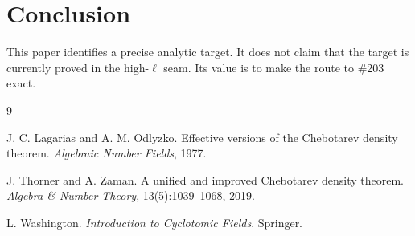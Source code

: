 \documentclass[11pt]{article}
\newcommand{\1}{\mathbf 1}
\begin{document}
\section{Conclusion}

This paper identifies a precise analytic target.  It does not claim that the target is currently proved in the high-\(\ell\) seam.  Its value is to make the route to \#203 exact.


\begin{thebibliography}{9}

J. C. Lagarias and A. M. Odlyzko.
\newblock Effective versions of the Chebotarev density theorem.
\newblock \emph{Algebraic Number Fields}, 1977.

J. Thorner and A. Zaman.
\newblock A unified and improved Chebotarev density theorem.
\newblock \emph{Algebra \& Number Theory}, 13(5):1039--1068, 2019.

L. Washington.
\newblock \emph{Introduction to Cyclotomic Fields}.
\newblock Springer.

\end{thebibliography}
\end{document}
